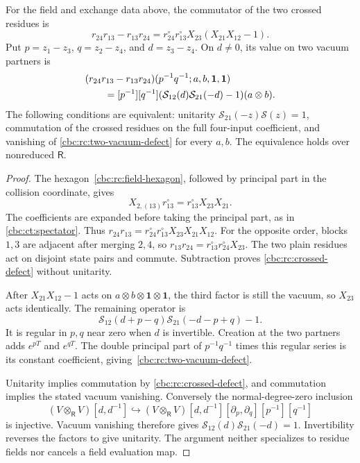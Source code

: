 \begin{theorem}
\label{cbc:rc:two-vacua}
For the field and exchange data above, the
commutator of the two crossed residues is
\begin{equation}\label{cbc:rc:crossed-defect}
 r_{24}r_{13}-r_{13}r_{24}
   =r^\circ_{24}r^\circ_{13}X_{23}(X_{21}X_{12}-1).
\end{equation}
Put $p=z_1-z_3$, $q=z_2-z_4$, and $d=z_3-z_4$.
On $d\ne0$, its value on two vacuum partners is
\begin{align}
 &(r_{24}r_{13}-r_{13}r_{24})
       (p^{-1}q^{-1};a,b,\mathbf1,\mathbf1)\notag\\
 &\qquad=[p^{-1}][q^{-1}]
       (\mathcal S_{12}(d)\mathcal S_{21}(-d)-1)(a\otimes b).
 \label{cbc:rc:two-vacuum-defect}
\end{align}
The following conditions are equivalent: unitarity
$\mathcal S_{21}(-z)\mathcal S(z)=1$, commutation of
the crossed residues on the full four-input
coefficient, and vanishing of
\eqref{cbc:rc:two-vacuum-defect} for every $a,b$.
The equivalence holds over nonreduced $\mathsf R$.
\end{theorem}
\begin{proof}
The hexagon~\eqref{cbc:rc:field-hexagon}, followed
by principal part in the collision coordinate,
gives
\[
 X_{2,(13)}r^\circ_{13}
       =r^\circ_{13}X_{23}X_{21}.
\]
The coefficients are expanded before taking
the principal part, as in
\eqref{cbc:ct:spectator}.
Thus $r_{24}r_{13}=r^\circ_{24}r^\circ_{13}
X_{23}X_{21}X_{12}$.
For the opposite order, blocks $1,3$ are
adjacent after merging $2,4$, so
$r_{13}r_{24}=r^\circ_{13}r^\circ_{24}X_{23}$.
The two plain residues act on disjoint
state pairs and commute. Subtraction proves
\eqref{cbc:rc:crossed-defect} without unitarity.

After $X_{21}X_{12}-1$ acts on
$a\otimes b\otimes\mathbf1\otimes\mathbf1$,
the third factor is still the vacuum, so
$X_{23}$ acts identically. The remaining
operator is
\[
 \mathcal S_{12}(d+p-q)\mathcal S_{21}(-d-p+q)-1.
\]
It is regular in $p,q$ near zero when $d$
is invertible. Creation at the two partners
adds $e^{pT}$ and $e^{qT}$. The double
principal part of $p^{-1}q^{-1}$ times
this regular series is its constant
coefficient, giving~\eqref{cbc:rc:two-vacuum-defect}.

Unitarity implies commutation by
\eqref{cbc:rc:crossed-defect}, and commutation
implies the stated vacuum vanishing.
Conversely the normal-degree-zero inclusion
\[
 (V\otimes_{\mathsf R}V)[d,d^{-1}]
 \hookrightarrow
 (V\otimes_{\mathsf R}V)[d,d^{-1}]
        [\partial_p,\partial_q][p^{-1}][q^{-1}]
\]
is injective. Vacuum vanishing therefore
gives $\mathcal S_{12}(d)\mathcal S_{21}(-d)=1$.
Invertibility reverses the factors to give
unitarity. The argument neither specializes
to residue fields nor cancels a field
evaluation map.
\end{proof}

